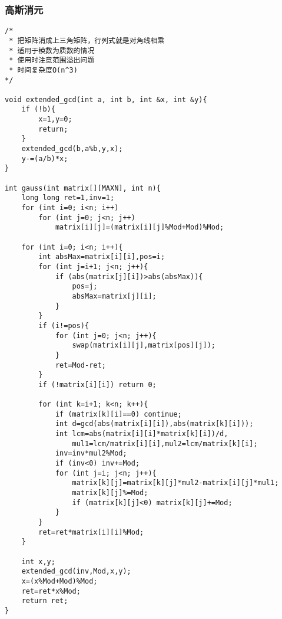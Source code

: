 \subsubsection{高斯消元}
\begin{verbatim}
/*
 * 把矩阵消成上三角矩阵，行列式就是对角线相乘
 * 适用于模数为质数的情况
 * 使用时注意范围溢出问题
 * 时间复杂度O(n^3)
*/

void extended_gcd(int a, int b, int &x, int &y){
    if (!b){
        x=1,y=0;
        return;
    }
    extended_gcd(b,a%b,y,x);
    y-=(a/b)*x;
}

int gauss(int matrix[][MAXN], int n){
    long long ret=1,inv=1;
    for (int i=0; i<n; i++)
        for (int j=0; j<n; j++)
            matrix[i][j]=(matrix[i][j]%Mod+Mod)%Mod;

    for (int i=0; i<n; i++){
        int absMax=matrix[i][i],pos=i;
        for (int j=i+1; j<n; j++){
            if (abs(matrix[j][i])>abs(absMax)){
                pos=j;
                absMax=matrix[j][i];
            }
        }
        if (i!=pos){
            for (int j=0; j<n; j++){
                swap(matrix[i][j],matrix[pos][j]);
            }
            ret=Mod-ret;
        }
        if (!matrix[i][i]) return 0;
        
        for (int k=i+1; k<n; k++){
            if (matrix[k][i]==0) continue;
            int d=gcd(abs(matrix[i][i]),abs(matrix[k][i]));
            int lcm=abs(matrix[i][i]*matrix[k][i])/d,
				mul1=lcm/matrix[i][i],mul2=lcm/matrix[k][i];
            inv=inv*mul2%Mod;
            if (inv<0) inv+=Mod;
            for (int j=i; j<n; j++){
                matrix[k][j]=matrix[k][j]*mul2-matrix[i][j]*mul1;
                matrix[k][j]%=Mod;
                if (matrix[k][j]<0) matrix[k][j]+=Mod;
            }
        }
        ret=ret*matrix[i][i]%Mod;
    }

    int x,y;
    extended_gcd(inv,Mod,x,y);
    x=(x%Mod+Mod)%Mod;
    ret=ret*x%Mod;
    return ret;
}

\end{verbatim}
